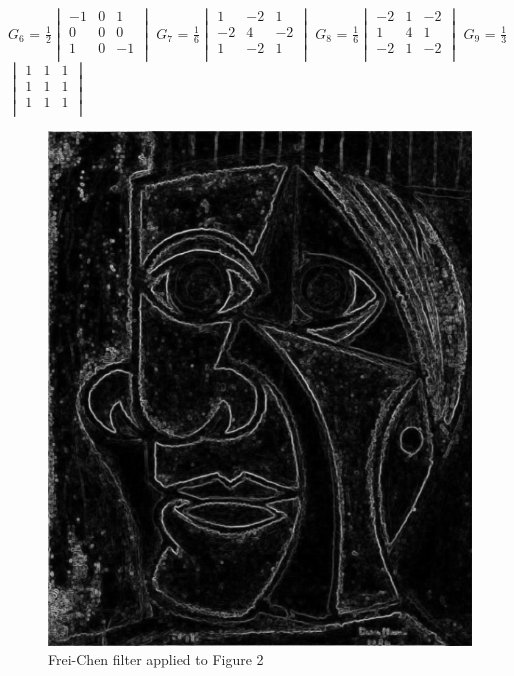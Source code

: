 \documentclass[12pt]{article}
\begin{document}
$G_6$ = $\frac{1}{2}$$\begin{vmatrix}
        -1 & 0 & 1\\
        0 & 0 & 0\\
        1 & 0 & -1\\
\end{vmatrix}$\hspace{5mm}
\newline
$G_7$ = $\frac{1}{6}$$\begin{vmatrix}
        1 & -2 & 1\\
        -2 & 4 & -2\\
        1 & -2 & 1\\
\end{vmatrix}$\hspace{13mm}
$G_8$ = $\frac{1}{6}$$\begin{vmatrix}
        -2 & 1 & -2\\
        1 & 4 & 1\\
        -2 & 1 & -2\\
\end{vmatrix}$\hspace{11mm}
$G_9$ = $\frac{1}{3}$$\begin{vmatrix}
        1 & 1 & 1\\
        1 & 1 & 1\\
        1 & 1 & 1\\
\end{vmatrix}$\hspace{5mm}

\begin{figure}[h]
\centering
\includegraphics[scale = 0.39]{img/picassoFreiChen}
\caption{Frei-Chen filter applied to Figure 2}
\end{figure}
\end{document}
